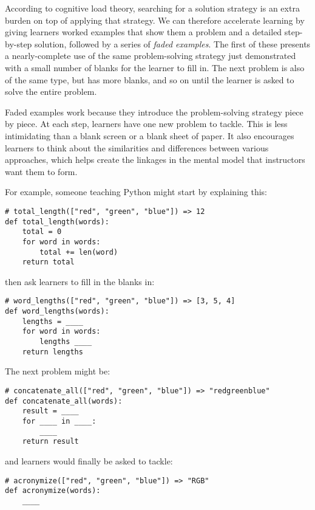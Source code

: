 According to cognitive load theory,
searching for a solution strategy is an extra burden
on top of applying that strategy.
We can therefore accelerate learning
by giving learners worked examples that show them a problem and a detailed step-by-step solution,
followed by a series of \emph{faded examples}.
The first of these presents a nearly-complete use of the same problem-solving strategy just demonstrated
with a small number of blanks for the learner to fill in.
The next problem is also of the same type,
but has more blanks,
and so on until the learner is asked to solve the entire problem.

Faded examples work because they introduce the problem-solving strategy piece by piece.
At each step,
learners have one new problem to tackle.
This is less intimidating than a blank screen or a blank sheet of paper.
It also encourages learners to think about the similarities and differences between various approaches,
which helps create the linkages in the mental model that instructors want them to form.

For example,
someone teaching Python might start by explaining this:

\begin{verbatim}# total_length(["red", "green", "blue"]) => 12
def total_length(words):
    total = 0
    for word in words:
        total += len(word)
    return total
\end{verbatim}

then ask learners to fill in the blanks in:

\begin{verbatim}# word_lengths(["red", "green", "blue"]) => [3, 5, 4]
def word_lengths(words):
    lengths = ____
    for word in words:
        lengths ____
    return lengths
\end{verbatim}

The next problem might be:

\begin{verbatim}# concatenate_all(["red", "green", "blue"]) => "redgreenblue"
def concatenate_all(words):
    result = ____
    for ____ in ____:
        ____
    return result
\end{verbatim}

and learners would finally be asked to tackle:

\begin{verbatim}# acronymize(["red", "green", "blue"]) => "RGB"
def acronymize(words):
    ____
\end{verbatim}


